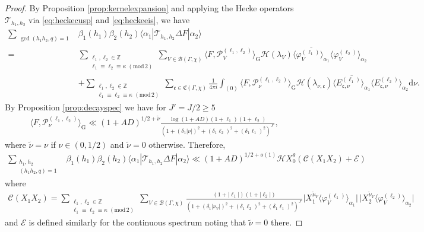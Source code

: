 \documentclass[12pt]{amsart}
\theoremstyle{definition}
\theoremstyle{remark}
\numberwithin{equation}{section}
\newcommand{\G}{\mathrm{G}}
\newcommand{\Z}{{\mathbb Z}}
\newcommand{\1}{{\mathbf 1}}
\renewcommand{\c}{\mathfrak c}
\renewcommand{\d}{\mathrm d}
\renewcommand{\pmod}[1]{\,\,(\mathrm{mod}\,{#1})}
\begin{document}
\begin{proof}
By Proposition \ref{prop:kernelexpansion} and applying the Hecke operators $\mathcal{T}_{h_1,h_2}$ via \eqref{eq:heckecusp} and \eqref{eq:heckeeis}, we have
\begin{align*}
  \sum_{\substack{\gcd(h_1h_2,q)=1}}&\beta_1(h_1)\beta_2(h_2)  \langle \alpha_1|\mathcal{T}_{h_1,h_2}  \Delta F | \alpha_2 \rangle  \\
    =& \sum_{\substack{\ell_1,\ell_2 \in \Z \\ \ell_1 \equiv \ell_2 \equiv \kappa \pmod{2}}} \sum_{V\in \mathcal{B}(\Gamma,\chi)} \langle F, \mathcal{P}^{(\ell_1,\ell_2)}_{V}\rangle_{\G}\mathcal{H}(\lambda_V) \overline{\langle\varphi_V^{(\ell_1)}\rangle_{\alpha_1}}\langle\varphi_V^{(\ell_2)}\rangle_{\alpha_2}\\
 &+\sum_{\substack{\ell_1,\ell_2 \in \Z \\ \ell_1 \equiv \ell_2 \equiv \kappa \pmod{2}}} \sum_{\mathfrak{c}\in \mathfrak{C}(\Gamma,\chi)} \frac{1}{4 \pi i}  \int_{(0)} \langle F, \mathcal{P}^{(\ell_1,\ell_2)}_{\nu}\rangle_{\G} \mathcal{H}(\lambda_{\nu,\c})  \overline{\langle E^{(\ell_1)}_{\mathfrak{c},\nu}\rangle_{\alpha_1} } \langle E^{(\ell_2)}_{\mathfrak{c},\nu}\rangle_{\alpha_2}  \d \nu.
\end{align*}
By Proposition \ref{prop:decayspec} we have for $J'= J/2\geq 5$
\begin{align*}
     \langle F, \mathcal{P}^{(\ell_1,\ell_2)}_{\nu}\rangle_{\G} \ll (1+AD)^{1/2+ \widetilde{\nu}} \frac{ \log(1+AD)(1+\ell_1)(1+\ell_2)}{(1+(\delta_1|\nu|)^2+(\delta_1 \ell_2)^2+(\delta_1 \ell_1)^2)^{J'} },
\end{align*}
where $\widetilde{\nu} = \nu$ if $\nu \in (0,1/2)$ and $\widetilde{\nu}=0$ otherwise. Therefore, 
\begin{align*}
      \sum_{\substack{h_1,h_2\\ (h_1h_2,q)=1}}&\beta_1(h_1)\beta_2(h_2)  \langle \alpha_1|\mathcal{T}_{h_1,h_2}  \Delta F | \alpha_2 \rangle \ll (1+AD)^{1/2+o(1)} \mathcal{H} X_0^\theta (\mathcal{C}(X_1X_2) + \mathcal{E})
\end{align*}
where
\begin{align*}
    \mathcal{C}(X_1X_2) =  \sum_{\substack{\ell_1,\ell_2 \in \Z \\ \ell_1 \equiv \ell_2 \equiv \kappa \pmod{2}}} \sum_{V\in \mathcal{B}(\Gamma,\chi)}  \frac{ (1+|\ell_1|)(1+|\ell_2|)}{(1+(\delta_1|\nu_V|)^2+(\delta_1 \ell_2)^2+(\delta_1 \ell_1)^2)^{J'} }\bigl|X_1^{\widetilde{\nu}_V}\langle\varphi_V^{(\ell_1)}\rangle_{\alpha_1}\bigr|\,\bigl|X_2^{\widetilde{\nu}_V}\langle\varphi_V^{(\ell_2)}\rangle_{\alpha_2}\bigr|
\end{align*}
and $\mathcal{E}$ is defined similarly for the continuous spectrum noting that $\widetilde{\nu}=0$ there.

\end{proof}
\end{document}
